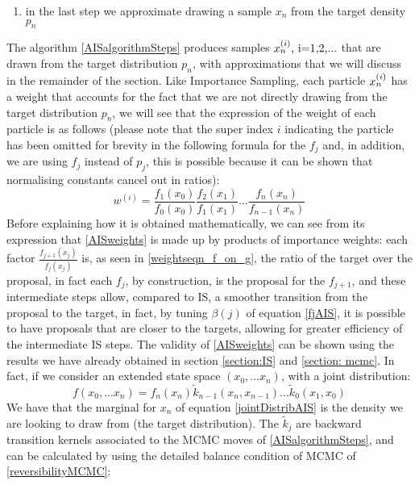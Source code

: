 \documentclass[12pt,mythesisstyle]{report}
\begin{document}
\begin{enumerate}[label=n.]
	\item in the last step we approximate drawing a sample $x_n$ from the target density $p_n$
\end{enumerate}
The algorithm \eqref{AISalgorithmSteps} produces samples $x_n^{\\(i\\)} \text{, i=1,2,...}$ that are drawn from the target distribution $p_n$, with approximations that we will discuss in the remainder of the section. Like Importance Sampling, each particle $x_n^{\\(i\\)}$ has a weight that accounts for the fact that we are not directly drawing from the target distribution $p_n$, we will see that the expression of the weight of each particle is as follows (please note that the super index $i$ indicating the particle has been omitted for brevity in the following formula for the $f_j$ and, in addition, we are using $f_j$ instead of $p_j$, this is possible because it can be shown \cite{annealedis} that normalising constants cancel out in ratios): 
\begin{equation}\label{AISweights}
w^{(i)}=\frac{f_{1}(x_{0})}{f_{0}(x_{0})}\frac{f_{2}(x_{1})}{f_{1}(x_{1})}\text{...}\frac{f_{n}(x_{n})}{f_{n-1}(x_{n})}
\end{equation}
Before explaining how it is obtained mathematically, we can see from its expression that \eqref{AISweights} is made up by products of importance weights: each factor $\frac{f_{j+1}(x_{j})}{f_{j}(x_{j})}$ is, as seen in \eqref{weightseqn_f_on_g}, the ratio of the target over the proposal, in fact each $f_j$, by construction, is the proposal for the $f_{j+1}$, and these intermediate steps allow, compared to IS, a smoother transition from the proposal to the target, in fact, by tuning $\beta(j)$ of equation \eqref{fjAIS}, it is possible to have proposals that are closer to the targets, allowing for greater efficiency of the intermediate IS steps. The validity of \eqref{AISweights} can be shown \cite{annealedis} using the results we have already obtained in section \ref{section:IS} and \ref{section: mcmc}. In fact, if we consider an extended state space $(x_0, ... x_n)$, with a joint distribution:
\begin{equation}\label{jointDistribAIS}
f(x_0, ... x_n)=f_n(x_n)\tilde{k}_{n-1}(x_n,x_{n-1})...\tilde{k}_0(x_1,x_{0})
\end{equation}
We have that the marginal for $x_n$ of equation \eqref{jointDistribAIS} is the density we are looking to draw from (the target distribution). The $\tilde{k}_j$ are backward transition kernels associated to the MCMC moves of \eqref{AISalgorithmSteps}, and can be calculated by using the detailed balance condition of MCMC of \eqref{reversibilityMCMC}:
\end{document}
